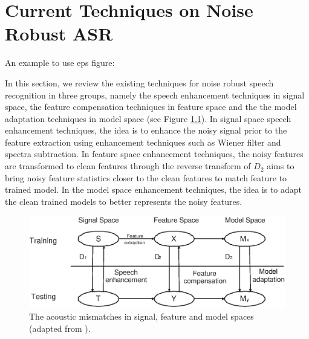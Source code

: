 \chapter{Current Techniques on Noise Robust ASR}
\label{chap:current_tech}

An example to use eps figure:

In this section, we review the existing techniques for noise robust
speech recognition in three groups, namely the speech enhancement
techniques in signal space, the feature compensation techniques in
feature space and the the model adaptation techniques in model space
(see Figure \ref{fig:ch2:mismatch}). In signal space speech
enhancement techniques, the idea is to enhance the noisy signal
prior to the feature extraction using enhancement techniques such as
Wiener filter and spectra subtraction. In feature
space enhancement techniques, the noisy features are transformed to
clean features through the reverse transform of $D_2$ aims to bring
noisy feature statistics closer to the clean features to match
feature to trained model. In the model space enhancement techniques,
the idea is to adapt the clean trained models to better represents
the noisy features.



\begin{figure}
\centerline{
\includegraphics[scale=0.8]{mismatch.eps}}
\vspace*{-2ex} \caption[The acoustic mismatches in signal, feature
and model spaces]{The acoustic mismatches in signal, feature and
model spaces (adapted from \cite{Lee98Review}).}
\label{fig:ch2:mismatch}
\end{figure}
